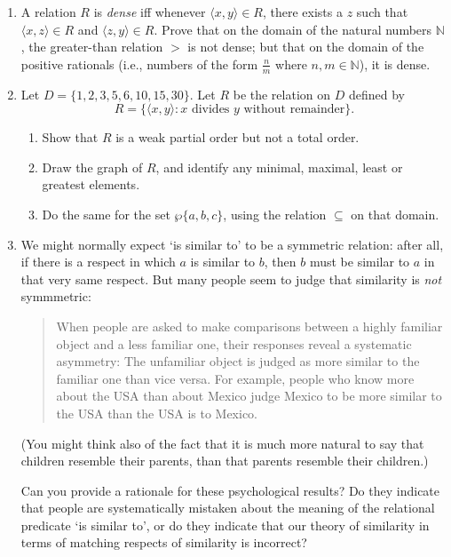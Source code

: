 {\begin{enumerate}
\item A relation $R$ is \emph{dense} iff whenever $\langle x,y\rangle \in R$, there exists a $z$ such that $\langle x,z\rangle \in R$ and $\langle z,y\rangle \in R$. Prove that on the domain of the natural numbers $\mathbb{N}$, the greater-than relation $>$ is not dense; but that on the domain of the positive rationals (i.e., numbers of the form $\frac{n}{m}$ where $n,m \in \mathbb{N}$), it is dense.

\item Let $D = \{1,2,3,5,6,10,15,30\}$. Let $R$ be the relation on $D$ defined by \begin{equation*}
	R = \{\langle x,y\rangle: x\text{ divides $y$ without remainder}\}.
\end{equation*}\begin{enumerate}
	\item Show that $R$ is a weak partial order but not a total order.
	\item Draw the graph of $R$, and identify any minimal, maximal, least or greatest elements.
	\item Do the same for the set $\wp \{a,b,c\}$, using the relation $\subseteq$ on that domain.
\end{enumerate}

\item	We might normally expect `is similar to' to be a symmetric relation: after all, if there is a respect in which $a$ is similar to $b$, then $b$ must be similar to $a$ in that very same respect. But many people seem to judge that similarity is \emph{not} symmmetric: \begin{quote}
		When people are asked to make comparisons between a highly familiar object and a less familiar one, their responses reveal a systematic asymmetry: The unfamiliar object is judged as more similar to the familiar one than vice versa. For example, people who know more about the USA than about Mexico judge Mexico to be more similar to the USA than the USA is to Mexico. \citep[520]{kunsocco}
	\end{quote} (You might think also of the fact that it is much more natural to say that children resemble their parents, than that parents resemble their children.)

	Can you provide a rationale for these psychological results? Do they indicate that people are systematically mistaken about the meaning of the relational predicate `is similar to', or do they indicate that our theory of similarity in terms of matching respects of similarity is incorrect?

\end{enumerate}

}



	









